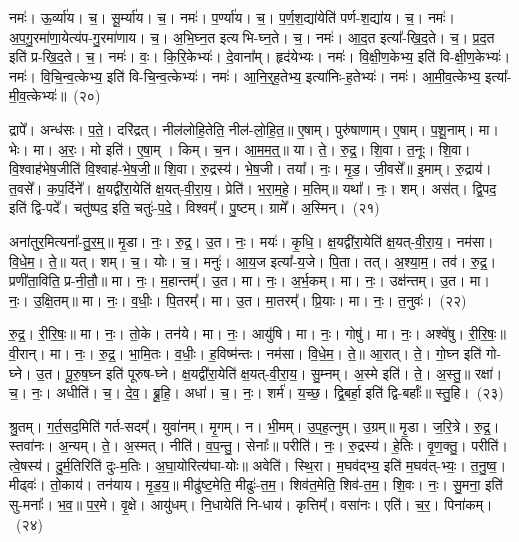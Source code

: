 नमः॑। ऊ॒र्व्या॑य। च॒। सू॒र्म्या॑य। च॒। 
नमः॑। प॒र्ण्या॑य। च॒। प॒र्ण॒श॒द्या॑येति॑ पर्ण-श॒द्या॑य। च॒। 
नमः॑। अ॒प॒गु॒रमा॑णा॒येत्य॑प-गु॒रमा॑णाय। च॒। अ॒भि॒घ्न॒त इत्यभि-घ्न॒ते। च॒। 
नमः॑। \mbox{आ॒\akhkhi{}द॒त} इत्या᳚-खि॒द॒ते। च॒। \mbox{प्र॒\akhkhi{}द॒त} इति॑ प्र-खि॒द॒ते। च॒। 
नमः॑। वः॒। कि॒रि॒केभ्यः॑। दे॒वाना᳚म्। हृद॑येभ्यः। नमः॑। 
वि॒क्षी॒ण॒केभ्य॒ इति॑ वि-क्षी॒ण॒केभ्यः॑। नमः॑। वि॒चि॒न्व॒त्केभ्य॒ इति॑ वि-चि॒न्व॒त्केभ्यः॑। नमः॑। 
आ॒नि॒र्॒‌ह॒तेभ्य॒ इत्या॑निः-ह॒तेभ्यः॑। नमः॑। आ॒मी॒व॒त्केभ्य॒ इत्या᳚-मी॒व॒त्केभ्यः॑॥~(२०)


द्रापे᳚। अन्ध॑सः। प॒ते॒। दरि॑द्रत्। नील॑लोहि॒तेति॒ नील॑-लो॒हि॒त॒॥ 
ए॒षाम्। पुरु॑षाणाम्। ए॒षाम्। प॒शू॒नाम्। मा। भेः। मा। अ॒रः॒। मो इति॑। ए॒षा॒म्। किम्। च॒न। आ॒म॒म॒त्॒॥ 
या। ते॒। रु॒द्र॒। शि॒वा। त॒नूः। शि॒वा। वि॒श्वाह॑भेष॒जीति॑ वि॒श्वाह॑-भे॒ष॒जी॒॥ 
शि॒वा। रु॒द्रस्य॑। भे॒ष॒जी। तया᳚। नः॒। मृ॒ड॒। जी॒वसे᳚॥ 
इ॒माम्। रु॒द्राय॑। त॒वसे᳚। क॒प॒र्दिने᳚। क्ष॒यद्वी॑रा॒येति॑ क्ष॒यत्-वी॒रा॒य॒। प्रेति॑। भ॒रा॒म॒हे॒। म॒तिम्॥ 
यथा᳚। नः॒। शम्। अस॑त्। द्वि॒पद॒ इति॑ द्वि-पदे᳚। चतु॑ष्पद॒ इति॒ चतुः॑-प॒दे॒। विश्वम्᳚। पु॒ष्टम्। ग्रामे᳚। अ॒स्मिन्।~(२१)


अना॑तुर॒मित्यना᳚-तु॒र॒म्॒॥ 
मृ॒डा। नः॒। रु॒द्र॒। उ॒त। नः॒। मयः॑। कृ॒धि॒। क्ष॒यद्वी॑रा॒येति॑ क्ष॒यत्-वी॒रा॒य॒। नम॑सा। वि॒धे॒म॒। ते॒॥ 
यत्। शम्। च॒। योः। च॒। मनुः॑। आ॒य॒ज इत्या᳚-य॒जे। पि॒ता। तत्। अ॒श्या॒म॒। तव॑। रु॒द्र॒। प्रणी॑ता॒विति॒ प्र-नी॒तौ॒॥ 
मा। नः॒। म॒हान्तम्᳚। उ॒त। मा। नः॒। अ॒र्भ॒कम्। मा। नः॒। उक्ष॑न्तम्। उ॒त। मा। नः॒। उ॒क्षि॒तम्॥ 
मा। नः॒। व॒धीः॒। पि॒तरम्᳚। मा। उ॒त। मा॒तरम्᳚। प्रि॒याः। मा। नः॒। त॒नुवः॑।~(२२)


रु॒द्र॒। री॒रि॒षः॒॥ 
मा। नः॒। तो॒के। तन॑ये। मा। नः॒। आयु॑षि। मा। नः॒। गोषु॑। मा। नः॒। अश्वे॑षु। री॒रि॒षः॒॥ 
वी॒रान्। मा। नः॒। रु॒द्र॒। भा॒मि॒तः। व॒धीः॒। ह॒विष्म॑न्तः। नम॑सा। वि॒धे॒म॒। ते॒॥ 
आ॒रात्। ते॒। गो॒घ्न इति॑ गो-घ्ने। उ॒त। पू॒रु॒ष॒घ्न इति॑ पूरुष-घ्ने। क्ष॒यद्वी॑रा॒येति॑ क्ष॒यत्-वी॒रा॒य॒। सु॒म्नम्। अ॒स्मे इति॑। ते॒। अ॒स्तु॒॥ 
रक्षा॑। च॒। नः॒। अधीति॑। च॒। दे॒व॒। ब्रू॒हि॒। अधा॑। च॒। नः॒। शर्म॑। य॒च्छ॒। द्वि॒बर्हा॒ इति॑ द्वि-बर्हाः᳚॥ 
स्तु॒हि।~(२३)


श्रु॒तम्। ग॒र्त॒सद॒मिति॑ गर्त-सदम्᳚। युवा॑नम्। मृ॒गम्। न। भी॒मम्। उ॒प॒ह॒त्नुम्। उ॒ग्रम्॥ 
मृ॒डा। ज॒रि॒त्रे। रु॒द्र॒। स्तवा॑नः। अ॒न्यम्। ते॒। अ॒स्मत्। नीति॑। व॒प॒न्तु॒। सेनाः᳚॥ 
परीति॑। नः॒। रु॒द्रस्य॑। हे॒तिः। वृ॒ण॒क्तु॒। परीति॑। त्वे॒षस्य॑। दु॒र्म॒तिरिति॑ दुः-म॒तिः। अ॒घा॒योरित्य॑घा-योः॥ 
अवेति॑। स्थि॒रा। म॒घव॑द्भ्य॒ इति॑ म॒घव॑त्-भ्यः॒। त॒नु॒ष्व॒। मीढ्वः॑। तो॒काय॑। तन॑याय। मृ॒ड॒य॒॥ 
मीढु॑ष्ट॒मेति॒ मीढुः॑-त॒म॒। शिव॑त॒मेति॒ शिव॑-त॒म॒। शि॒वः। नः॒। सु॒मना॒ इति॑ सु-मनाः᳚। भ॒व॒॥ 
प॒र॒मे। वृ॒क्षे। आयु॑धम्। नि॒धायेति॑ नि-धाय॑। कृत्तिम्᳚। वसा॑नः। एति॑। च॒र॒। पिना॑कम्।~(२४)


